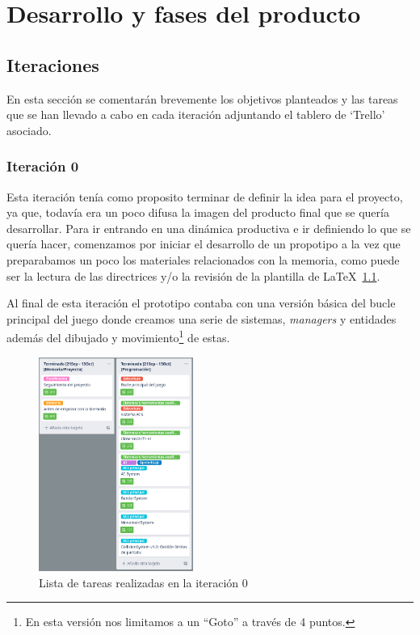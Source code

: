 \chapter{Desarrollo y fases del producto}
\section{Iteraciones}
En esta sección se comentarán brevemente los objetivos planteados y las tareas que
se han llevado a cabo en cada iteración adjuntando el tablero de `Trello' asociado.

\subsection{Iteración 0}
Esta iteración tenía como proposito terminar de definir la idea para el
proyecto, ya que, todavía era un poco difusa la imagen del producto final que se quería desarrollar.
Para ir entrando en una dinámica productiva e ir definiendo lo que se quería hacer,
comenzamos por iniciar el desarrollo de un propotipo a la vez que preparabamos un poco
los materiales relacionados con la memoria, como puede ser la lectura de las directrices
y/o la revisión de la plantilla de \LaTeX~\ref{img:it_0}.

Al final de esta iteración el prototipo contaba con una versión básica del bucle principal
del juego donde creamos una serie de sistemas, \textit{managers} y entidades además del dibujado
y movimiento\footnote{En esta versión nos limitamos a un ``Goto'' a través de 4 puntos.} de 
estas.

\begin{figure}[ht]
\centering
\includegraphics[width=0.45\textwidth]{imagenes/metodologia/tareas_it0.png}
\caption{Lista de tareas realizadas en la iteración 0}
\label{img:it_0}
\end{figure}

